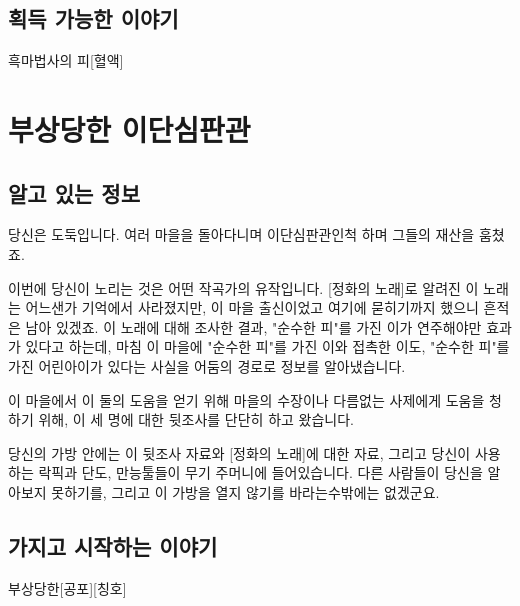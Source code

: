 \documentclass{report}
\begin{document}
		\subsection*{획득 가능한 이야기}
			\begin{spoiler}{흑마법사의 피}{[혈액]}
			\end{spoiler}
	
	
	
	
	\pagebreak
	\section{부상당한 이단심판관}
		\subsection*{알고 있는 정보}
			당신은 도둑입니다. 여러 마을을 돌아다니며 이단심판관인척 하며 그들의 재산을 훔쳤죠.
			
			이번에 당신이 노리는 것은 어떤 작곡가의 유작입니다. [정화의 노래]로 알려진 이 노래는 어느샌가 기억에서 사라졌지만, 이 마을 출신이었고 여기에 묻히기까지 했으니 흔적은 남아 있겠죠. 이 노래에 대해 조사한 결과, "순수한 피"를 가진 이가 연주해야만 효과가 있다고 하는데, 마침 이 마을에 "순수한 피"를 가진 이와 접촉한 이도, "순수한 피"를 가진 어린아이가 있다는 사실을 어둠의 경로로 정보를 알아냈습니다.
			
			이 마을에서 이 둘의 도움을 얻기 위해 마을의 수장이나 다름없는 사제에게 도움을 청하기 위해, 이 세 명에 대한 뒷조사를 단단히 하고 왔습니다.
			
			당신의 가방 안에는 이 뒷조사 자료와 [정화의 노래]에 대한 자료, 그리고 당신이 사용하는 락픽과 단도, 만능툴들이 무기 주머니에 들어있습니다. 다른 사람들이 당신을 알아보지 못하기를, 그리고 이 가방을 열지 않기를 바라는수밖에는 없겠군요.
			
		\subsection*{가지고 시작하는 이야기}
			\begin{spoiler}{부상당한}{[공포][칭호]}
				
			\end{spoiler}
			
\end{document}
